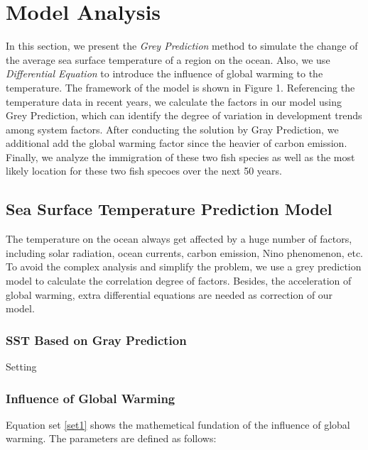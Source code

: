\documentclass{mcmthesis}
\begin{document}
\section{Model Analysis} \label{S4}
		In this section, we present the \emph{Grey Prediction} method to simulate the change of the average sea surface temperature of a region on the ocean. Also, we use \emph{Differential Equation} to introduce the influence of global warming to the temperature. The framework of the model is shown in Figure 1. Referencing the temperature data in recent years, we calculate the factors in our model using Grey Prediction, which can identify the degree of variation in development trends among system factors. After conducting the solution by Gray Prediction, we additional add the global warming factor since the heavier of carbon emission. Finally, we analyze the immigration of these two fish species as well as the most likely location for these two fish specoes over the next 50 years.

\subsection{Sea Surface Temperature Prediction Model}\label{S4s1}
	The temperature on the ocean always get affected by a huge number of factors, including solar radiation, ocean currents, carbon emission, Nino phenomenon, etc. To avoid the complex analysis and simplify the problem, we use a grey prediction model to calculate the correlation degree of factors. Besides, the acceleration of global warming, extra differential equations are needed as correction of our model.

\subsubsection{SST Based on Gray Prediction}\label{S4ss1}
	Setting 

\subsubsection{Influence of Global Warming}\label{S4ss2}
	Equation set \ref{set1} shows the mathemetical fundation of the influence of global warming. The parameters are defined as follows:
\end{document}
